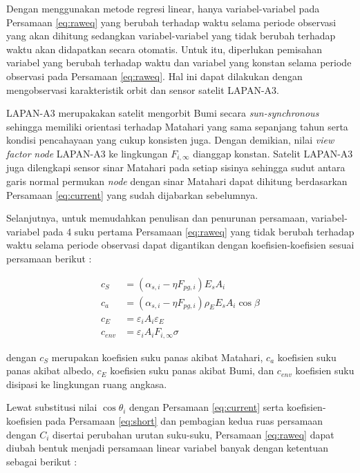 Dengan menggunakan metode regresi linear, hanya variabel-variabel pada
Persamaan \ref{eq:raweq} yang berubah terhadap waktu selama periode observasi
yang akan dihitung sedangkan variabel-variabel yang tidak berubah terhadap
waktu akan didapatkan secara otomatis. Untuk itu, diperlukan pemisahan variabel
yang berubah terhadap waktu dan variabel yang konstan selama periode observasi
pada Persamaan \ref{eq:raweq}. Hal ini dapat dilakukan dengan mengobservasi
karakteristik orbit dan sensor satelit LAPAN-A3.

LAPAN-A3 merupakakan satelit mengorbit Bumi secara \textit{sun-synchronous}
sehingga memiliki orientasi terhadap Matahari yang sama sepanjang tahun serta
kondisi pencahayaan yang cukup konsisten juga. Dengan demikian, nilai
\textit{view factor} \textit{node} LAPAN-A3 ke lingkungan $F_{i,\infty}$
dianggap konstan. Satelit LAPAN-A3 juga dilengkapi sensor sinar Matahari pada
setiap sisinya sehingga sudut antara garis normal permukan \textit{node} dengan
sinar Matahari dapat dihitung berdasarkan Persamaan \ref{eq:current} yang sudah
dijabarkan sebelumnya.

Selanjutnya, untuk memudahkan penulisan dan penurunan persamaan,
variabel-variabel pada 4 suku pertama Persamaan \ref{eq:raweq} yang tidak
berubah terhadap waktu selama periode observasi dapat digantikan dengan
koefisien-koefisien sesuai persamaan berikut :

\begin{equation}
\label{eq:short}
\begin{split}
	c_{S} &= \left(\alpha_{s,i} - \eta F_{pg,i}\right) E_s A_i \\
	c_{a} &= \left(\alpha_{s,i} - \eta F_{pg,i}\right)\rho_{E} E_s A_i \cos{\beta} \\
	c_{E} &= \varepsilon_i A_i \varepsilon_E \\
	c_{env} &= \varepsilon_i A_i F_{i,\infty} \sigma
\end{split}
\end{equation}

dengan $c_{S}$ merupakan koefisien suku panas akibat Matahari, $c_{a}$
koefisien suku panas akibat albedo, $c_{E}$ koefisien suku panas akibat Bumi,
dan $c_{env}$ koefisien suku disipasi ke lingkungan ruang angkasa.

Lewat substitusi nilai $\cos{\theta_i}$ dengan Persamaan \ref{eq:current} serta
koefisien-koefisien pada Persamaan \ref{eq:short} dan pembagian kedua ruas
persamaan dengan $C_i$ disertai perubahan urutan suku-suku,
Persamaan \ref{eq:raweq} dapat diubah bentuk menjadi persamaan linear variabel banyak
dengan ketentuan sebagai berikut :


